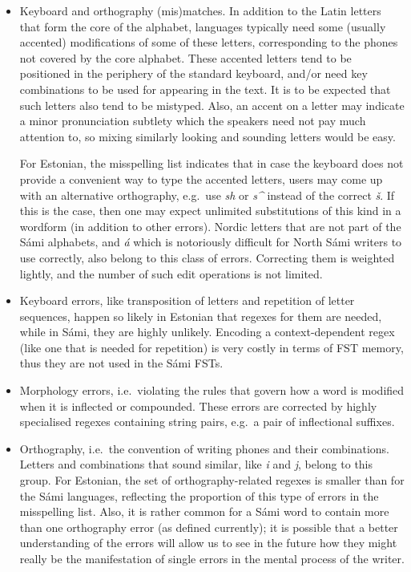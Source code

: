 \documentclass{flammie}
\begin{document}
\begin{itemize}
\item Keyboard and orthography (mis)matches. In addition to the Latin letters
    that form the core of the alphabet, languages typically need some (usually
        accented) modifications of some of these letters, corresponding to the
        phones not covered by the core alphabet. These accented letters tend to
        be positioned in the periphery of the standard keyboard, and/or need
        key combinations to be used for appearing in the text. It is to be
        expected that such letters also tend to be mistyped. Also, an accent on
        a letter may indicate a minor pronunciation subtlety which the speakers
        need not pay much attention to, so mixing similarly looking and sounding
        letters would be easy.

For Estonian, the misspelling list indicates that in case the keyboard does not
        provide a convenient way to type the accented letters, users may come up
        with an alternative orthography, e.g.\ use \textit{sh} or \textit{s\^{}}
        instead of the correct \textit{š}. If this is the case, then one may
        expect unlimited substitutions of this kind in a wordform (in addition
        to other errors). Nordic letters that are not part of the Sámi
        alphabets, and \textit{á} which is notoriously difficult for North Sámi
        writers to use correctly, also belong to this class of errors.
        Correcting them is weighted lightly, and the number of such edit
        operations is not limited.

\item Keyboard errors, like transposition of letters and repetition of letter
    sequences, happen so likely in Estonian that regexes for them are needed,
        while  in Sámi, they are highly unlikely. Encoding a context-dependent
        regex (like one that is needed for repetition) is very costly in terms
        of FST memory, thus they are not used in the Sámi FSTs.

\item Morphology errors, i.e.\ violating the rules that govern how a word is
    modified when it is inflected or compounded.  These errors are corrected by
        highly specialised regexes containing string pairs, e.g.\ a pair of
        inflectional suffixes.

\item Orthography, i.e.\ the convention of writing phones and their
    combinations.  Letters and combinations that sound similar, like \textit{i}
        and \textit{j}, belong to this group. For Estonian, the set of
        orthography-related regexes is smaller than for the Sámi languages,
        reflecting the proportion of this type of errors in the misspelling
        list. Also, it is rather common for a Sámi word to contain more than one
        orthography error (as defined currently); it is possible that a better
        understanding of the errors will allow us to see in the future how they
        might really be the manifestation of single errors in the mental process
        of the writer.

\end{itemize}
\end{document}
